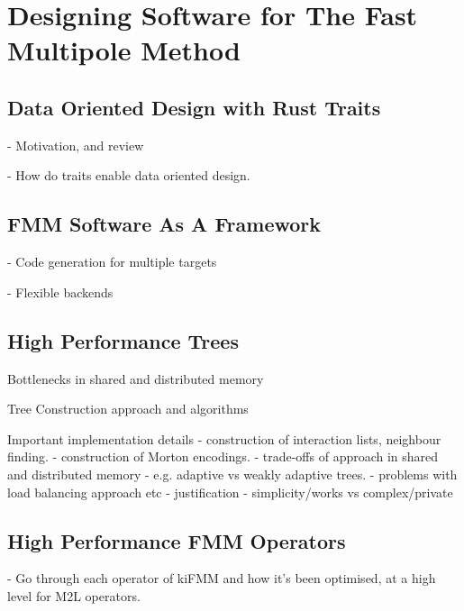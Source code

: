 \chapter{Designing Software for The Fast Multipole Method}\label{chpt:designing_software_for_fmm}
\thispagestyle{chaptertitle} %


\section{Data Oriented Design with Rust Traits}

- Motivation, and review

- How do traits enable data oriented design.

\section{FMM Software As A Framework}

- Code generation for multiple targets

- Flexible backends


\section{High Performance Trees}

Bottlenecks in shared and distributed memory

Tree Construction approach and algorithms

Important implementation details
    - construction of interaction lists, neighbour finding.
    - construction of Morton encodings.
    - trade-offs of approach in shared and distributed memory
        - e.g. adaptive vs weakly adaptive trees.
        - problems with load balancing approach etc
    - justification
        - simplicity/works vs complex/private


\section{High Performance FMM Operators}

- Go through each operator of kiFMM and how it's been optimised, at a high level for M2L operators.








% 
% 
% 
% 